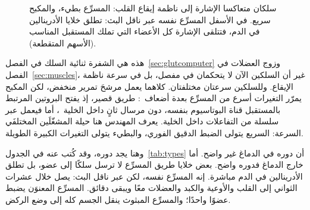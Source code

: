 \begin{figure}[t]
\centering
{}
\caption{سلكان متعاكسا الإشارة إلى ناظمة إيقاع القلب: المسرِّع  بطيء، والمكبح  سريع. في الأسفل المسرِّع نفسه عبر ناقل البث: تطلق خلايا  الأدرينالين في الدم، فتتلقى الإشارة كل الأعضاء التي تملك المستقبل المناسب (الأسهم المتقطعة).}
\label{fig:gasbrake}
\end{figure}

هذه هي الشفرة ثنائية السلك في الفصل~\ref{sec:glutcomputer} وزوج العضلات في الفصل~\ref{sec:muscles}، غير أن السلكين الآن لا يتحكمان في مفصل، بل في سرعة ناظمة الإيقاع. وللسلكين سرعتان مختلفتان. كلاهما يعمل مرشحَ تمرير منخفض، لكن المكبح يمرّر التغيرات أسرع من المسرِّع بعدة أضعاف~\cite{Berger1989}: طريق  قصير، إذ يفتح البروتين المرتبط بالمستقبل قناة البوتاسيوم بنفسه، دون مرسال ثانٍ داخل الخلية~\cite{Logothetis1987gbg}، أما  فيعمل عبر سلسلة من التفاعلات داخل الخلية. يعرف المهندس هنا حيلة المشغّلَين المختلفَي السرعة: السريع يتولى الضبط الدقيق الفوري، والبطيء يتولى التغيرات الكبيرة الطويلة.

وهنا يجد  دوره، وقد كُتب عنه في الجدول~\ref{tab:types} أن دوره في الدماغ غير واضح. أما خارج الدماغ فدوره واضح. بعض خلايا طريق المسرِّع لا ترسل سلكًا إلى عضو، بل تطلق الأدرينالين في الدم مباشرة. إنه المسرِّع نفسه، لكن عبر ناقل البث: يصل خلال عشرات الثواني إلى القلب والأوعية والكبد والعضلات معًا ويبقى دقائق. المسرِّع المعنوَن  يضبط عضوًا واحدًا؛ والمسرِّع المبثوث  ينقل الجسم كله إلى وضع الركض.

